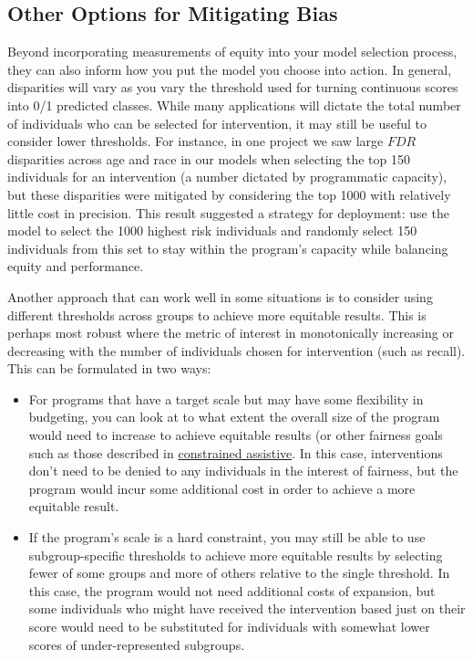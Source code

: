 \documentclass[]{krantz}
\begin{document}
\subsection{Other Options for Mitigating
Bias}\label{other-options-for-mitigating-bias}

Beyond incorporating measurements of equity into your model selection
process, they can also inform how you put the model you choose into
action. In general, disparities will vary as you vary the threshold used
for turning continuous scores into 0/1 predicted classes. While many
applications will dictate the total number of individuals who can be
selected for intervention, it may still be useful to consider lower
thresholds. For instance, in one project we saw large \(FDR\)
disparities across age and race in our models when selecting the top 150
individuals for an intervention (a number dictated by programmatic
capacity), but these disparities were mitigated by considering the top
1000 with relatively little cost in precision. This result suggested a
strategy for deployment: use the model to select the 1000 highest risk
individuals and randomly select 150 individuals from this set to stay
within the program's capacity while balancing equity and performance.

Another approach that can work well in some situations is to consider
using different thresholds across groups to achieve more equitable
results. This is perhaps most robust where the metric of interest in
monotonically increasing or decreasing with the number of individuals
chosen for intervention (such as recall). This can be formulated in two
ways:

\begin{itemize}
\item
  For programs that have a target scale but may have some flexibility in
  budgeting, you can look at to what extent the overall size of the
  program would need to increase to achieve equitable results (or other
  fairness goals such as those described in
  \protect\hyperlink{sec:constrainedassistive}{constrained assistive}.
  In this case, interventions don't need to be denied to any individuals
  in the interest of fairness, but the program would incur some
  additional cost in order to achieve a more equitable result.
\item
  If the program's scale is a hard constraint, you may still be able to
  use subgroup-specific thresholds to achieve more equitable results by
  selecting fewer of some groups and more of others relative to the
  single threshold. In this case, the program would not need additional
  costs of expansion, but some individuals who might have received the
  intervention based just on their score would need to be substituted
  for individuals with somewhat lower scores of under-represented
  subgroups.
\end{itemize}
\end{document}
